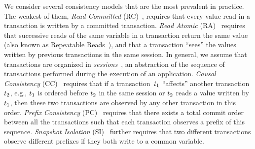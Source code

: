%
%
%
%
We consider several consistency models that are the most prevalent in practice. The weakest of them, \emph{Read Committed} (RC)~\cite{DBLP:conf/sigmod/BerensonBGMOO95}, requires that every value read in a transaction is written by a committed transaction. \emph{Read Atomic} (RA)~\cite{DBLP:conf/concur/Cerone0G15} requires that successive reads of the same variable in a transaction return the same value (also known as Repeatable Reads~\cite{DBLP:conf/sigmod/BerensonBGMOO95}), and that a transaction ``sees'' the values written by previous transactions in the same session. In general, we assume that transactions are organized in \emph{sessions}~\cite{DBLP:conf/pdis/TerryDPSTW94}, an abstraction of the sequence of transactions performed during the execution of an application.
\emph{Causal Consistency} (CC)~\cite{DBLP:journals/cacm/Lamport78} requires that if a transaction~${t}_1$ ``affects'' another transaction ${t}_2$, e.g., ${t}_1$ is ordered before ${t}_2$ in the same session or ${t}_2$ reads a value written by ${t}_1$, then these two transactions are observed by any other transaction in this order. \emph{Prefix Consistency} (PC)~\cite{DBLP:conf/ecoop/BurckhardtLPF15} requires that there exists a total commit order between all the transactions such that each transaction observes a prefix of this sequence. \emph{Snapshot Isolation} (SI)~\cite{DBLP:conf/sigmod/BerensonBGMOO95} further requires that two different transactions observe different prefixes if they both write to a common variable.

